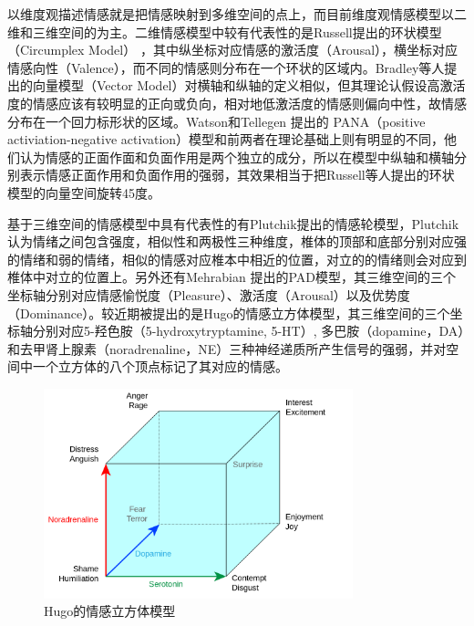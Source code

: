 以维度观描述情感就是把情感映射到多维空间的点上，而目前维度观情感模型以二维和三维空间的为主。二维情感模型中较有代表性的是Russell提出的环状模型（Circumplex Model）\cite{Russell1980Cir} ，其中纵坐标对应情感的激活度（Arousal），横坐标对应情感向性（Valence），而不同的情感则分布在一个环状的区域内。Bradley等人\cite{Bradley1992Rem}提出的向量模型（Vector Model）对横轴和纵轴的定义相似，但其理论认假设高激活度的情感应该有较明显的正向或负向，相对地低激活度的情感则偏向中性，故情感分布在一个回力标形状的区域。Watson和Tellegen \cite{Watson1985Tow} 提出的 PANA（positive activiation-negative activation）模型和前两者在理论基础上则有明显的不同，他们认为情感的正面作面和负面作用是两个独立的成分，所以在模型中纵轴和横轴分别表示情感正面作用和负面作用的强弱，其效果相当于把Russell等人提出的环状模型的向量空间旋转45度\cite{Rubin2009A}。

基于三维空间的情感模型中具有代表性的有Plutchik\cite{Plutchik1980Emo}提出的情感轮模型，Plutchik认为情绪之间包含强度，相似性和两极性三种维度，椎体的顶部和底部分别对应强的情绪和弱的情绪，相似的情感对应椎本中相近的位置，对立的的情绪则会对应到椎体中对立的位置上。另外还有Mehrabian \cite{Mehrabian1996Pleasure}提出的PAD模型，其三维空间的三个坐标轴分别对应情感愉悦度（Pleasure）、激活度（Arousal）以及优势度（Dominance）。较近期被提出的是Hugo\cite{Hugo2012A}的情感立方体模型，其三维空间的三个坐标轴分别对应5-羟色胺（5-hydroxytryptamine, 5-HT）, 多巴胺（dopamine，DA）和去甲肾上腺素（noradrenaline，NE）三种神经递质所产生信号的强弱，并对空间中一个立方体的八个顶点标记了其对应的情感。

\begin{figure}[H] %
  \centering
  \includegraphics[width=0.8\textwidth]{img/hugo_cube_of_emotion.png}
  \caption{Hugo\cite{Hugo2012A}的情感立方体模型}
  \label{fig:hugo_cube_of_emotion}
\end{figure}

